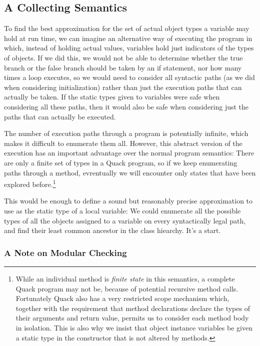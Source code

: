 \documentclass[11pt]{article}
\begin{document}
\subsection{A Collecting Semantics}

To find the best approximation for the set of actual object types a
variable may hold at run time, we can imagine an alternative way of
executing the program in which, instead of holding actual values,
variables hold just indicators of the types of objects.  If we did
this, we would not be able to determine whether the true branch or the
false branch should be taken by an if statement, nor how many times a
loop executes, so we would need to consider all syntactic paths (as we
did when considering initialization) rather than just the execution
paths that can actually be taken.   If the static types given to
variables were safe when considering all these paths, then it would
also be safe when considering just the paths that can actually be
executed.  

The number of execution paths through a program is potentially
infinite, which makes it difficult to enumerate them all.  However,
this abstract version of the execution has an important advantage over
the normal program semantics:  There are only a finite set of types in
a Quack program, so if we keep enumerating paths through a method,
evrentually we will encounter only states that have been explored
before.\footnote{While an individual method is \emph{finite state} in
  this semantics, a complete Quack program may not be, because of
  potential recursive method calls.  Fortunately Quack also has a very
  restricted scope mechanism which, together with the requirement that
  method declarations declare the types of their arguments and return
  value, permits us to consider each method body in isolation. This is
  also why we insist that object instance variables be given a static
  type in the constructor that is not altered by methods.}

This would be enough to define a sound but reasonably precise
approximation to use as the static type of a local variable:  We could
enumerate all the possible types of all the objects assigned to a
variable on every syntactically legal path, and find their least
common ancestor in the class hiearchy. 
It's a start. 

\subsubsection{A Note on Modular Checking}
\end{document}
